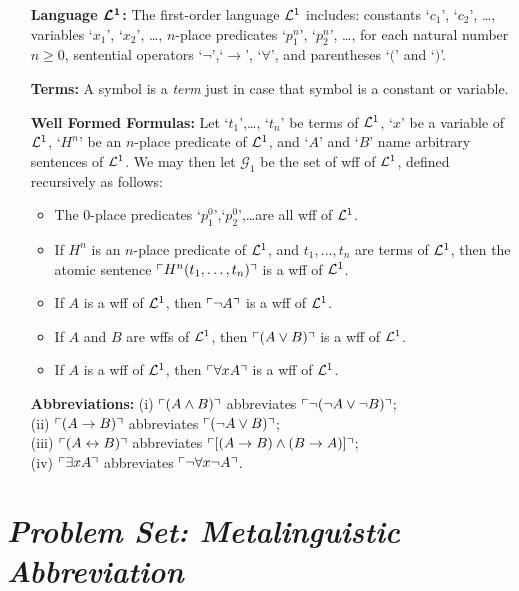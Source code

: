 \documentclass[a4paper, 11pt]{article} %
\begin{document}
\begin{enumerate}[leftmargin=1.2in,labelsep=.15in] %
\item[\bf Language $\boldsymbol{\mathcal{L}^1}$:] The first-order language $\mathcal{L}^1$ includes: constants `$c_1$', `$c_2$', \dots, variables `$x_1$', `$x_2$', \dots, $n$-place predicates `$p_1^n$', `$p_2^n$', \dots, for each natural number $n\geq0$, sentential operators `$\neg$',`$\rightarrow$', `$\forall$', and parentheses `$($' and `$)$'.
\item[\bf Terms:] A symbol is a \textit{term} just in case that symbol is a constant or variable.
\item[\bf Well Formed Formulas:] Let `$t_1$',\dots, `$t_n$' be terms of $\mathcal{L}^1$, `$x$' be a variable of $\mathcal{L}^1$, `$H^n$' be an $n$-place predicate of $\mathcal{L}^1$, and `$A$' and `$B$' name arbitrary sentences of $\mathcal{L}^1$. We may then let $\mathcal{G}_1$ be the set of wff of $\mathcal{L}^1$, defined recursively as follows:
\begin{itemize}
\item The 0-place predicates `$p_1^0$',`$p_2^0$',\dots are all wff of $\mathcal{L}^1$.
\item If ${H^n}$ is an $n$-place predicate of $\mathcal{L}^1$, and ${t_1},\dots,{t_n}$ are terms of $\mathcal{L}^1$, then the atomic sentence $\ulcorner H^n(t_1,\dots,t_n)\urcorner$ is a wff of $\mathcal{L}^1$.
\item If ${A}$ is a wff of $\mathcal{L}^1$, then $\ulcorner\neg A\urcorner$ is a wff of $\mathcal{L}^1$.
\item If ${A}$ and ${B}$ are wffs of $\mathcal{L}^1$, then $\ulcorner(A\vee B)\urcorner$ is a wff of $\mathcal{L}^1$.
\item If ${A}$ is a wff of $\mathcal{L}^1$, then $\ulcorner\forall xA\urcorner$ is a wff of $\mathcal{L}^1$.
\end{itemize}
\item[\bf Abbreviations:] (i) $\ulcorner(A\wedge B)\urcorner$ abbreviates $\ulcorner\neg(\neg A\vee\neg B)\urcorner$;\\ (ii) $\ulcorner(A\rightarrow B)\urcorner$ abbreviates $\ulcorner(\neg A\vee B)\urcorner$;\\ (iii) $\ulcorner(A\leftrightarrow B)\urcorner$ abbreviates $\ulcorner[(A\rightarrow B)\wedge(B\rightarrow A)]\urcorner$;\\ (iv) $\ulcorner\exists xA\urcorner$ abbreviates $\ulcorner\neg\forall x\neg A\urcorner$.
\end{enumerate}



\section*{\it Problem Set: Metalinguistic Abbreviation}
\end{document}
